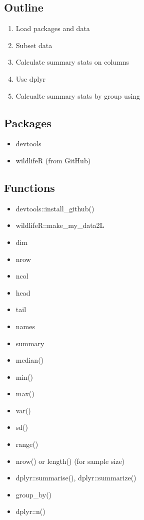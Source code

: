 \documentclass[]{book}
\providecommand{\tightlist}{%
  \setlength{\itemsep}{0pt}\setlength{\parskip}{0pt}}
\theoremstyle{definition}
\theoremstyle{definition}
\theoremstyle{definition}
\theoremstyle{remark}
\begin{document}
\subsection{Outline}\label{outline-2}

\begin{enumerate}
\def\labelenumi{\arabic{enumi}.}
\tightlist
\item
  Load packages and data
\item
  Subset data
\item
  Calculate summary stats on columns
\item
  Use dplyr
\item
  Calcualte summary stats by group using
\end{enumerate}

\subsection{Packages}\label{packages-7}

\begin{itemize}
\tightlist
\item
  devtools
\item
  wildlifeR (from GitHub)
\end{itemize}

\subsection{Functions}\label{functions-1}

\begin{itemize}
\tightlist
\item
  devtools::install\_github()
\item
  wildlifeR::make\_my\_data2L
\item
  dim
\item
  nrow
\item
  ncol
\item
  head
\item
  tail
\item
  names
\item
  summary
\item
  median()
\item
  min()
\item
  max()
\item
  var()
\item
  sd()
\item
  range()
\item
  nrow() or length() (for sample size)
\item
  dplyr::summarise(), dplyr::summarize()
\item
  group\_by()
\item
  dplyr::n()
\end{itemize}
\end{document}
